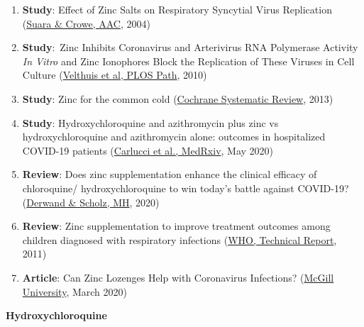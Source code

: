 \begin{enumerate}
\def\labelenumi{\arabic{enumi}.}
\tightlist
\item
  \textbf{Study}: Effect of Zinc Salts on Respiratory Syncytial Virus
  Replication
  (\href{https://www.ncbi.nlm.nih.gov/pmc/articles/PMC353050/}{Suara \&
  Crowe, AAC}, 2004)
\item
  \textbf{Study}:~Zinc Inhibits Coronavirus and Arterivirus RNA
  Polymerase Activity \emph{In Vitro} and Zinc Ionophores Block the
  Replication of These Viruses in Cell Culture
  (\href{https://www.ncbi.nlm.nih.gov/pmc/articles/PMC2973827/}{Velthuis
  et al, PLOS Path}, 2010)
\item
  \textbf{Study}: Zinc for the common cold
  (\href{https://www.cochranelibrary.com/cdsr/doi/10.1002/14651858.CD001364.pub4/full}{Cochrane
  Systematic Review}, 2013)
\item
  \textbf{Study}: Hydroxychloroquine and azithromycin plus zinc vs
  hydroxychloroquine and azithromycin alone: outcomes in hospitalized
  COVID-19 patients
  (\href{https://www.medrxiv.org/content/10.1101/2020.05.02.20080036v1}{Carlucci
  et al., MedRxiv}, May 2020)
\item
  \textbf{Review}: Does zinc supplementation enhance the clinical
  efficacy of chloroquine/ hydroxychloroquine to win today's battle
  against COVID-19?
  (\href{https://www.sciencedirect.com/science/article/pii/S0306987720306435}{Derwand
  \& Scholz, MH}, 2020)
\item
  \textbf{Review}: Zinc supplementation to improve treatment outcomes
  among children diagnosed with respiratory infections
  (\href{https://www.who.int/elena/titles/bbc/zinc_pneumonia_children/en/}{WHO,
  Technical Report}, 2011)
\item
  \textbf{Article}: Can Zinc Lozenges Help with Coronavirus Infections?
  (\href{https://www.mcgill.ca/oss/article/health/can-zinc-lozenges-help-coronavirus-infections}{McGill
  University}, March 2020)
\end{enumerate}

\textbf{Hydroxychloroquine}

